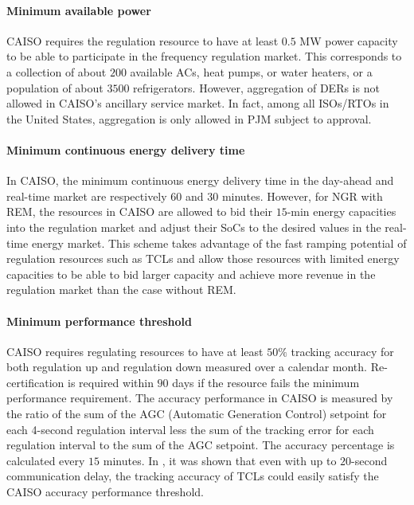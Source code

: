 \documentclass[onecolumn,journal]{IEEEtran}
\newcommand{\cut}[1]{}
\begin{document}
\paragraph{Minimum available power} \ac{CAISO} requires the regulation resource to have at least $0.5$ MW power capacity to be able to participate in the frequency regulation market. This corresponds to a collection of about $200$ available ACs, heat pumps, or water heaters, or a population of about $3500$ refrigerators. However, aggregation of DERs is not allowed in \ac{CAISO}'s ancillary service market. In fact, among all ISOs/RTOs in the United States, aggregation is only allowed in \ac{PJM} subject to approval.


\paragraph{Minimum continuous energy delivery time} In \ac{CAISO}, the minimum continuous energy delivery time in the day-ahead and real-time market are respectively $60$ and $30$ minutes. However, for NGR with REM, the resources in \ac{CAISO} are allowed to bid their $15$-min energy capacities into the regulation market and adjust their SoCs to the desired values in the real-time energy market. This scheme takes advantage of the fast ramping potential of regulation resources such as \acp{TCL} and allow those resources with limited energy capacities to be able to bid larger capacity and achieve more revenue in the regulation market than the case without REM. 

\paragraph{Minimum performance threshold} CAISO requires regulating resources to have at least $50\%$ tracking accuracy for both regulation up and regulation down measured over a calendar month. Re-certification is required within $90$ days if the resource fails the minimum performance requirement. The accuracy performance in CAISO is measured by the ratio of the sum of the AGC (Automatic Generation Control) setpoint for each 4-second regulation interval less the sum of  the tracking error for each regulation interval to the sum of the AGC setpoint. The accuracy percentage is calculated every $15$ minutes.  In \cite{HH_BS_KP_TV_ACC:2014}, it was shown that even with up to $20$-second communication delay, the tracking accuracy of \acp{TCL} could easily satisfy the CAISO accuracy performance threshold. \cut{ In \ac{PJM}, the participating resources are required to pass several tests with performance scores of $0.75$ or above in order to be qualified for regulation service.}
\end{document}
